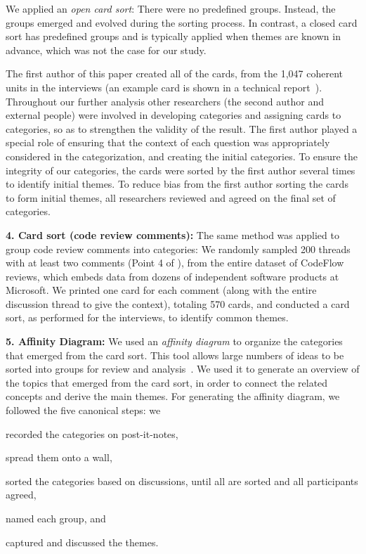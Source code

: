 We applied an \emph{open card sort}: There were no predefined groups. Instead, the
groups emerged and evolved during the sorting process. In contrast, a closed
card sort has predefined groups and is typically applied when themes are known
in advance, which was not the case for our study.

The first author of this paper created all of the cards, from the 1,047
coherent units in the interviews (an example card is shown in a technical report~\cite{bacchelli2012appendix}). Throughout our further analysis other
researchers (the second author and external people) were involved in developing
categories and assigning cards to categories, so as to strengthen the validity
of the result. The first author played a special role of ensuring that the
context of each question was appropriately considered in the categorization,
and creating the initial categories. To ensure the integrity of our categories,
the cards were sorted by the first author several times to identify initial
themes. To reduce bias from the first author sorting the cards to form initial themes, all researchers reviewed and agreed on the final set of
categories.

\textbf{4. Card sort (code review comments):} The same method was applied to group code
review comments into categories: We randomly sampled 200 threads with at least
two comments (\eg Point 4 of ), from the entire dataset of CodeFlow
reviews, which embeds data from dozens of independent software products at
Microsoft. We printed one card for each comment (along with the entire
discussion thread to give the context), totaling 570 cards, and conducted a
card sort, as performed for the interviews, to identify common themes.

\textbf{5. Affinity Diagram:} We used an \emph{affinity diagram} to organize the categories
that emerged from the card sort. This tool allows large numbers of ideas to be
sorted into groups for review and analysis~\cite{shade2000improving}. We used it
to generate an overview of the topics that emerged from the card sort, in order
to connect the related concepts and derive the main themes. For generating the
affinity diagram, we followed the five canonical steps: we \begin{inparaenum}[(1)] 
\item recorded the categories on post-it-notes, 
\item spread them onto a wall, 
\item sorted the categories based on discussions, until all are sorted and all participants agreed, 
\item named each group, and 
\item captured and discussed the themes.
\end{inparaenum}


